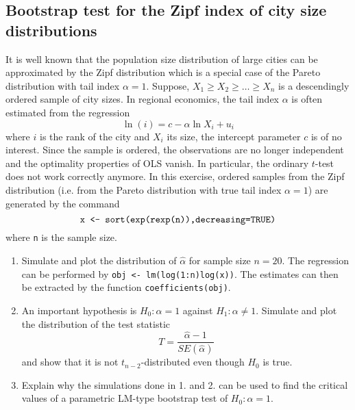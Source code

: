 \documentclass{article}
\begin{document}
\subsection{Bootstrap test for the Zipf index of city size distributions}

It is well known that the population size distribution of large cities can
be approximated by the Zipf distribution which is a special case of the
Pareto distribution with tail index $\alpha =1$. Suppose, $X_{1}\geq
X_{2}\geq \ldots \geq X_{n}$ is a descendingly ordered sample of city sizes.
In regional economics, the tail index $\alpha $ is often estimated from the
regression%
\begin{equation*}
\ln \left( i\right) =c-\alpha \ln X_{i}+u_{i}
\end{equation*}%
where $i$ is the rank of the city and $X_{i}$ its size, the intercept
parameter $c$ is of no interest. Since the sample is ordered, the
observations are no longer independent and the optimality properties of OLS
vanish. In particular, the ordinary $t$-test does not work correctly anymore. In this exercise, ordered samples
from the Zipf distribution (i.e. from the Pareto distribution with true tail
index $\alpha =1$) are generated by the command%
\begin{equation*}
\text{\texttt{x <- sort(exp(rexp(n)),decreasing=TRUE)}}
\end{equation*}%
where \texttt{n} is the sample size.

\begin{enumerate}\setlength{\itemsep}{0pt}
\item Simulate and plot the distribution of $\hat{\alpha}$ for sample size $%
n=20$. The regression can be performed by \texttt{obj <-
lm(log(1:n)log(x))}. The estimates can then be extracted by the
function \texttt{coefficients(obj)}.

\item An important hypothesis is $H_{0}:\alpha =1$ against $H_{1}:\alpha
\neq 1$. Simulate and plot the distribution of the test statistic%
\begin{equation*}
T=\frac{\hat{\alpha}-1}{SE(\hat{\alpha})}
\end{equation*}%
and show that it is not $t_{n-2}$-distributed even though $H_{0}$ is true.

\item Explain why the simulations done in 1. and 2. can be used to find the
critical values of a parametric LM-type bootstrap test of $H_{0}:\alpha =1$.
\end{enumerate}
\end{document}
